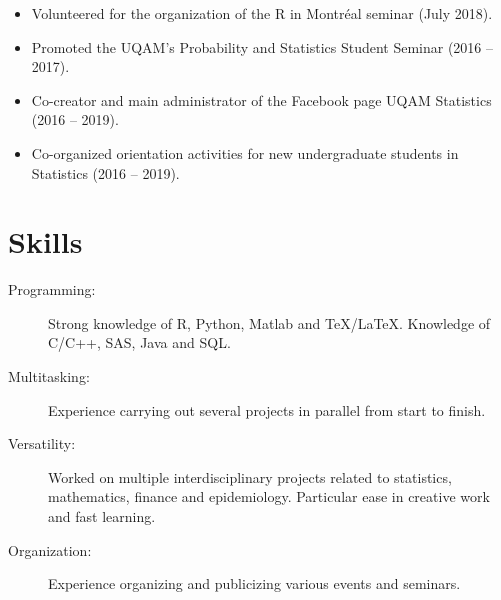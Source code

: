\documentclass[11pt, sans]{moderncv}
\begin{document}
\begin{itemize}
	\item Volunteered for the organization of the R in Montréal seminar (July 2018).
	\vspace{5pt}
	
	\item Promoted the UQAM's Probability and Statistics Student Seminar (2016 -- 2017).
	\vspace{5pt}
	
	\item Co-creator and main administrator of the Facebook page UQAM Statistics (2016 -- 2019).
	\vspace{5pt}
	
	\item Co-organized orientation activities for new undergraduate students in Statistics (2016 -- 2019).
\end{itemize}


\section{Skills  }

\begin{description}
	\item[Programming: ] Strong knowledge of R, Python, Matlab and TeX/LaTeX. Knowledge of C/C++, SAS, Java and SQL.
	\vspace{5pt}
	
	\item[Multitasking: ] Experience carrying out several projects in parallel from start to finish.
	\vspace{5pt}
	
	\item[Versatility: ] Worked on multiple interdisciplinary projects related to statistics, mathematics, finance and epidemiology. Particular ease in creative work and fast learning.
	\vspace{5pt}
	
	\item[Organization: ] Experience organizing and publicizing various events and seminars.
	\vspace{5pt}
\end{description}
 
 
%
\end{document}
